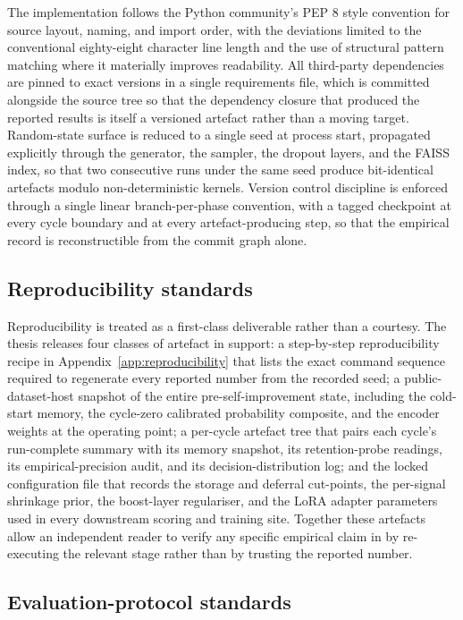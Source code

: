 The implementation follows the Python community's PEP 8 style convention for source layout, naming, and import order, with the deviations limited to the conventional eighty-eight character line length and the use of structural pattern matching where it materially improves readability. All third-party dependencies are pinned to exact versions in a single requirements file, which is committed alongside the source tree so that the dependency closure that produced the reported results is itself a versioned artefact rather than a moving target. Random-state surface is reduced to a single seed at process start, propagated explicitly through the generator, the sampler, the dropout layers, and the FAISS index, so that two consecutive runs under the same seed produce bit-identical artefacts modulo non-deterministic kernels. Version control discipline is enforced through a single linear branch-per-phase convention, with a tagged checkpoint at every cycle boundary and at every artefact-producing step, so that the empirical record is reconstructible from the commit graph alone.

\subsection{Reproducibility standards}
\label{sec:std-reproducibility}

Reproducibility is treated as a first-class deliverable rather than a courtesy. The thesis releases four classes of artefact in support: a step-by-step reproducibility recipe in Appendix~\ref{app:reproducibility} that lists the exact command sequence required to regenerate every reported number from the recorded seed; a public-dataset-host snapshot of the entire pre-self-improvement state, including the cold-start memory, the cycle-zero calibrated probability composite, and the encoder weights at the operating point; a per-cycle artefact tree that pairs each cycle's run-complete summary with its memory snapshot, its retention-probe readings, its empirical-precision audit, and its decision-distribution log; and the locked configuration file that records the storage and deferral cut-points, the per-signal shrinkage prior, the boost-layer regulariser, and the LoRA adapter parameters used in every downstream scoring and training site. Together these artefacts allow an independent reader to verify any specific empirical claim in  by re-executing the relevant stage rather than by trusting the reported number.

\subsection{Evaluation-protocol standards}
\label{sec:std-evaluation}

